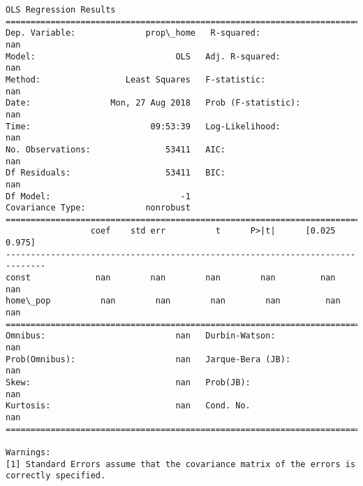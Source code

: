 \documentclass[11pt]{article}
\begin{document}
    \begin{Verbatim}[commandchars=\\\{\}]
                            OLS Regression Results                            
==============================================================================
Dep. Variable:              prop\_home   R-squared:                         nan
Model:                            OLS   Adj. R-squared:                    nan
Method:                 Least Squares   F-statistic:                       nan
Date:                Mon, 27 Aug 2018   Prob (F-statistic):                nan
Time:                        09:53:39   Log-Likelihood:                    nan
No. Observations:               53411   AIC:                               nan
Df Residuals:                   53411   BIC:                               nan
Df Model:                          -1                                         
Covariance Type:            nonrobust                                         
==============================================================================
                 coef    std err          t      P>|t|      [0.025      0.975]
------------------------------------------------------------------------------
const             nan        nan        nan        nan         nan         nan
home\_pop          nan        nan        nan        nan         nan         nan
==============================================================================
Omnibus:                          nan   Durbin-Watson:                     nan
Prob(Omnibus):                    nan   Jarque-Bera (JB):                  nan
Skew:                             nan   Prob(JB):                          nan
Kurtosis:                         nan   Cond. No.                          nan
==============================================================================

Warnings:
[1] Standard Errors assume that the covariance matrix of the errors is correctly specified.

    \end{Verbatim}
\end{document}

